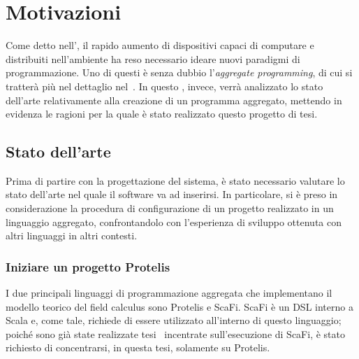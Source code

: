\chapter{Motivazioni}\label{ch:motivations}


  Come detto nell', il rapido aumento di dispositivi capaci di computare e distribuiti nell'ambiente ha reso necessario ideare nuovi paradigmi di programmazione.
  Uno di questi è senza dubbio l'\emph{aggregate programming}, di cui si tratterà più nel dettaglio nel~.
  In questo , invece, verrà analizzato lo stato dell'arte relativamente alla creazione di un programma aggregato,
  mettendo in evidenza le ragioni per la quale è stato realizzato questo progetto di tesi.

  \section{Stato dell'arte}\label{sec:state-of-art}

  Prima di partire con la progettazione del sistema, è stato necessario valutare lo stato dell'arte nel quale il software va ad inserirsi.
  In particolare, si è preso in considerazione la procedura di configurazione di un progetto realizzato in un linguaggio aggregato,
  confrontandolo con l'esperienza di sviluppo ottenuta con altri linguaggi in altri contesti.

  \subsection{Iniziare un progetto Protelis}\label{subsec:setup}

  I due principali linguaggi di programmazione aggregata che implementano il modello teorico del field calculus sono Protelis e ScaFi.
  ScaFi è un DSL interno a Scala e, come tale, richiede di essere utilizzato all'interno di questo linguaggio;
  poiché sono già state realizzate tesi~\cite{amslaurea12188,amslaurea16824} incentrate sull'esecuzione di ScaFi,
  è stato richiesto di concentrarsi, in questa tesi, solamente su Protelis.

